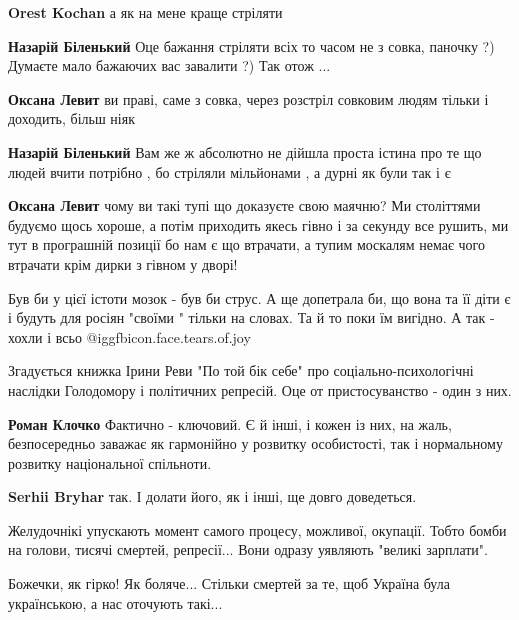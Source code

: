 \begin{itemize}
\begin{itemize}
\textbf{Orest Kochan} а як на мене краще стріляти

\textbf{Назарій Біленький} Оце бажання стріляти всіх то часом не з совка, паночку ?) Думаєте мало бажаючих вас завалити ?) Так отож ...

\textbf{Оксана Левит} ви праві, саме з совка, через розстріл совковим людям тільки і доходить, більш ніяк

\textbf{Назарій Біленький} Вам же ж абсолютно не дійшла проста істина про те що людей вчити потрібно , бо стріляли мільйонами , а дурні як були так і є

\textbf{Оксана Левит} чому ви такі тупі що доказуєте свою маячню? Ми століттями будуємо щось хороше, а потім приходить якесь гівно і за секунду все рушить, ми тут в програшній позиції бо нам є що втрачати, а тупим москалям немає чого втрачати крім дирки з гівном у дворі!

\end{itemize} %


Був би у цієї істоти мозок - був би струс. А ще допетрала би, що вона та її
діти є і будуть для росіян "своїми " тільки на словах. Та й то поки їм вигідно.
А так - хохли і всьо  @igg{fbicon.face.tears.of.joy} 



Згадується книжка Ірини Реви "По той бік себе" про соціально-психологічні
наслідки Голодомору і політичних репресій. Оце от пристосуванство - один з них.

\begin{itemize} %
\textbf{Роман Клочко} Фактично - ключовий. Є й інші, і кожен із них, на жаль, безпосередньо заважає як гармонійно у розвитку особистості, так і нормальному розвитку національної спільноти.

\textbf{Serhii Bryhar} так. І долати його, як і інші, ще довго доведеться.
\end{itemize} %


Желудочнікі упускають момент самого процесу, можливої, окупації. Тобто бомби на
голови, тисячі смертей, репресії... Вони одразу уявляють "великі зарплати".


Божечки, як гірко!
Як боляче...
Стільки смертей за те, щоб Україна була українською, а нас оточують такі...


\end{itemize}
